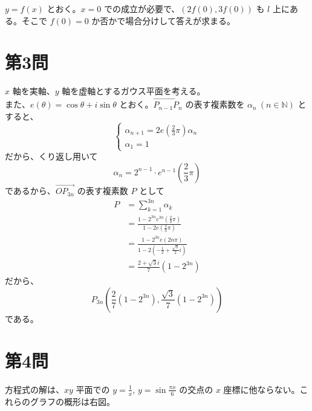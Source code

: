 \documentclass[../main.tex]{subfiles}
\begin{document}
\bigskip
\noindent
[\textbf{解2 - 略}] $y = f(x)$ とおく。$x = 0$ での成立が必要で、$(2f(0), 3f(0))$ も $l$ 上にある。そこで $f(0) = 0$ か否かで場合分けして答えが求まる。

\newpage

\section*{第3問}

\noindent
[\textbf{解}] $x$ 軸を実軸、$y$ 軸を虚軸とするガウス平面を考える。\\
また、$e(\theta) = \cos\theta + i\sin\theta$ とおく。$\overrightarrow{P_{n-1}P_n}$ の表す複素数を $\alpha_n\ (n \in \mathbb{N})$ とすると、
\[
  \begin{cases}
    \alpha_{n+1} = 2 e\left(\frac{2}{3}\pi\right) \alpha_n \\
    \alpha_1 = 1
  \end{cases}
\]
だから、くり返し用いて
\[
  \alpha_n = 2^{n-1} \cdot e^{n-1}\left(\frac{2}{3}\pi\right)
\]
であるから、$\overrightarrow{OP_{3n}}$ の表す複素数 $P$ として
\begin{align*}
  P &= \sum_{k=1}^{3n} \alpha_k \\
  &= \frac{1 - 2^{3n} e^{3n}\left(\frac{2}{3}\pi\right)}{1 - 2 e\left(\frac{2}{3}\pi\right)} \\
  &= \frac{1 - 2^{3n} e(2n\pi)}{1 - 2 \left(-\frac{1}{2} + \frac{\sqrt{3}}{2}i\right)} \\
  &= \frac{2 + \sqrt{3}i}{7} \left(1 - 2^{3n}\right)
\end{align*}
だから、
\[
  P_{3n} \left( \frac{2}{7}(1 - 2^{3n}), \frac{\sqrt{3}}{7}(1 - 2^{3n}) \right)
\]
である。

\newpage

\section*{第4問}

\noindent
[\textbf{解}] 方程式の解は、$xy$ 平面での $y = \frac{1}{x}$, $y = \sin\frac{\pi x}{6}$ の交点の $x$ 座標に他ならない。これらのグラフの概形は右図。

\begin{center}
\end{center}
\end{document}
